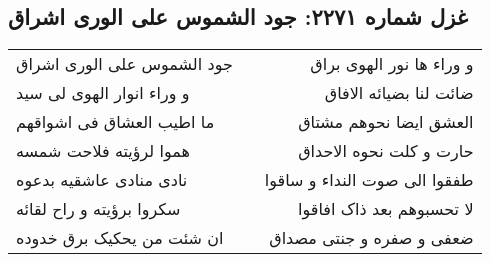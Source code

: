 \begin{center}
\section*{غزل شماره ۲۲۷۱: جود الشموس علی الوری اشراق}
\label{sec:2271}
\begin{longtable}{l p{0.5cm} r}
جود الشموس علی الوری اشراق
&&
و وراء ها نور الهوی براق
\\
و وراء انوار الهوی لی سید
&&
ضائت لنا بضیائه الافاق
\\
ما اطیب العشاق فی اشواقهم
&&
العشق ایضا نحوهم مشتاق
\\
هموا لرؤیته فلاحت شمسه
&&
حارت و کلت نحوه الاحداق
\\
نادی منادی عاشقیه بدعوه
&&
طفقوا الی صوت النداء و ساقوا
\\
سکروا برؤیته و راح لقائه
&&
لا تحسبوهم بعد ذاک افاقوا
\\
ان شئت من یحکیک برق خدوده
&&
ضعفی و صفره و جنتی مصداق
\\
\end{longtable}
\end{center}

